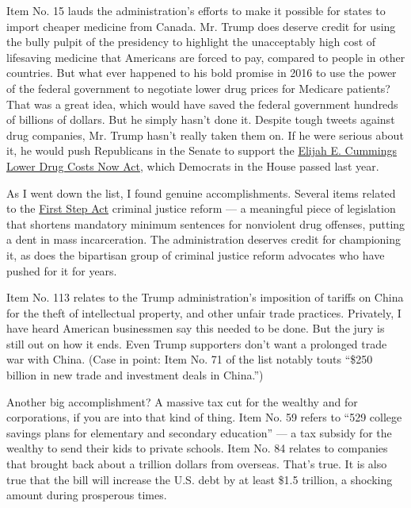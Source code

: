 Item No. 15 lauds the administration's efforts to make it possible for
states to import cheaper medicine from Canada. Mr. Trump does deserve
credit for using the bully pulpit of the presidency to highlight the
unacceptably high cost of lifesaving medicine that Americans are forced
to pay, compared to people in other countries. But what ever happened to
his bold promise in 2016 to use the power of the federal government to
negotiate lower drug prices for Medicare patients? That was a great
idea, which would have saved the federal government hundreds of billions
of dollars. But he simply hasn't done it. Despite tough tweets against
drug companies, Mr. Trump hasn't really taken them on. If he were
serious about it, he would push Republicans in the Senate to support the
\href{https://sires.house.gov/media-center/press-releases/house-of-representatives-passes-hr-3-the-elijah-e-cummings-lower-drug\#:~:text=Representatives\%20passed\%20H.R.-,3\%2C\%20the\%20Elijah\%20E.,vote\%20of\%20230\%20to\%20192.\&text=said\%20Congressman\%20Sires.-,H.R.,for\%20prescription\%20drugs\%20at\%20\%242\%2C000.}{Elijah
E. Cummings Lower Drug Costs Now Act}, which Democrats in the House
passed last year.

As I went down the list, I found genuine accomplishments. Several items
related to the
\href{https://www.nytimes3xbfgragh.onion/2019/06/11/opinion/first-step-act-drug-offenders.html}{First
Step Act} criminal justice reform --- a meaningful piece of legislation
that shortens mandatory minimum sentences for nonviolent drug offenses,
putting a dent in mass incarceration. The administration deserves credit
for championing it, as does the bipartisan group of criminal justice
reform advocates who have pushed for it for years.

Item No. 113 relates to the Trump administration's imposition of tariffs
on China for the theft of intellectual property, and other unfair trade
practices. Privately, I have heard American businessmen say this needed
to be done. But the jury is still out on how it ends. Even Trump
supporters don't want a prolonged trade war with China. (Case in point:
Item No. 71 of the list notably touts ``\$250 billion in new trade and
investment deals in China.'')

Another big accomplishment? A massive tax cut for the wealthy and for
corporations, if you are into that kind of thing. Item No. 59 refers to
``529 college savings plans for elementary and secondary education'' ---
a tax subsidy for the wealthy to send their kids to private schools.
Item No. 84 relates to companies that brought back about a trillion
dollars from overseas. That's true. It is also true that the bill will
increase the U.S. debt by at least \$1.5 trillion, a shocking amount
during prosperous times.

